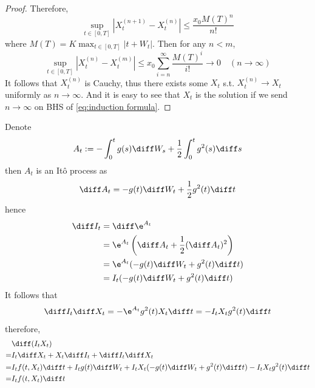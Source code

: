 \begin{proof}
        Therefore,
        \[\sup_{t\in[0,T]}
        \left|X_t^{(n+1)}-X_t^{(n)}\right|
        \leq\frac{x_0M(T)^n}{n!}\]
        where $M(T)=K\max_{t\in[0,T]}|t+W_t|$.
        Then for any $n<m$,
        \[\sup_{t\in[0,T]}\left|X_t^{(n)}-X_t^{(m)}\right|
        \leq x_0\sum_{i=n}^\infty\frac{M(T)^i}{i!}
        \to 0\quad (n\to\infty)\]
        It follows that $X_t^{(n)}$ is Cauchy,
        thus there exists some $X_t$ s.t.
        $X_t^{(n)}\to X_t$
        uniformly as $n\to\infty$.
        And it is easy to see that $X_t$ is the solution
        if we send $n\to\infty$ on BHS of \cref{eq:induction formula}.
    \end{proof}

    \problem
    Denote
    \[A_t:=-\int_0^tg(s)\diff W_s+\frac{1}{2}\int_0^tg^2(s)\diff s\]
    then $A_t$ is an It\^o process as
    \[\diff A_t=-g(t)\diff W_t+\frac{1}{2}g^2(t)\diff t\]
    hence
    \[\begin{aligned}
        \diff I_t&=\diff \e^{A_t}\\
        &=\e^{A_t}\left(\diff A_t+\frac{1}{2}(\diff A_t)^2\right)\\
        &=\e^{A_t}(-g(t)\diff W_t+g^2(t)\diff t)\\
        &=I_t(-g(t)\diff W_t+g^2(t)\diff t)
    \end{aligned}\]
    It follows that
    \[\diff I_t\diff X_t=-\e^{A_t}g^2(t)X_t\diff t=-I_tX_tg^2(t)\diff t\]
    therefore,
    \[\begin{aligned}
        &\diff(I_tX_t)\\
        =&I_t\diff X_t+X_t\diff I_t+\diff I_t\diff X_t\\
        =&I_tf(t,X_t)\diff t+I_tg(t)\diff W_t+I_tX_t(-g(t)\diff W_t+g^2(t)\diff t)
        -I_tX_tg^2(t)\diff t\\
        =&I_tf(t,X_t)\diff t
    \end{aligned}\]

